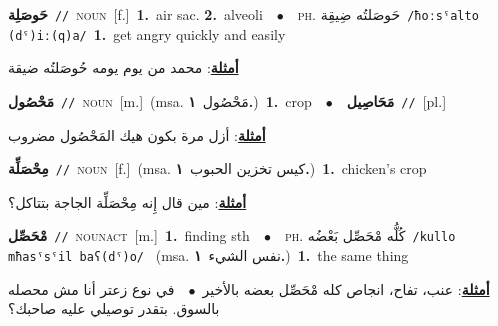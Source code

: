 \documentclass[10pt,a4paper,twoside]{article} %
\begin{document}
\begin{multicols}{2}
{\setlength\topsep{0pt}\textbf{\foreignlanguage{arabic}{حَوصَلِة}}\ {\color{gray}\texttt{//}\color{black}}\ \textsc{noun}\ [f.]\ \textbf{1.}~air sac.  \textbf{2.}~alveoli\ \ $\bullet$\ \ \textsc{ph.} \color{gray} \foreignlanguage{arabic}{حَوصَلتُه ضِيقِة}\color{black}\ {\color{gray}\texttt{/{\sffamily ħoːsˤalto (dˤ)iː(q)a}/}\color{black}}\ \textbf{1.}~get angry quickly and easily\  \begin{flushright}\color{gray}\foreignlanguage{arabic}{\textbf{\underline{\foreignlanguage{arabic}{أمثلة}}}: محمد من يوم يومه حُوصَلتُه ضيقة}\end{flushright}\color{black}} \vspace{2mm}

{\setlength\topsep{0pt}\textbf{\foreignlanguage{arabic}{مَحْصُول}}\ {\color{gray}\texttt{//}\color{black}}\ \textsc{noun}\ [m.]\ \color{gray}(msa. \foreignlanguage{arabic}{مَحْصُول}~\foreignlanguage{arabic}{\textbf{١.}})\color{black}\ \textbf{1.}~crop\ \ $\bullet$\ \ \setlength\topsep{0pt}\textbf{\foreignlanguage{arabic}{مَحَاصِيل}}\ {\color{gray}\texttt{//}\color{black}}\ [pl.]\  \begin{flushright}\color{gray}\foreignlanguage{arabic}{\textbf{\underline{\foreignlanguage{arabic}{أمثلة}}}: أزل مرة بكون هيك المَحْصُول مضروب}\end{flushright}\color{black}} \vspace{2mm}

{\setlength\topsep{0pt}\textbf{\foreignlanguage{arabic}{مِحْصَلِّة}}\ {\color{gray}\texttt{//}\color{black}}\ \textsc{noun}\ [f.]\ \color{gray}(msa. \foreignlanguage{arabic}{كيس تخزين الحبوب}~\foreignlanguage{arabic}{\textbf{١.}})\color{black}\ \textbf{1.}~chicken's crop\  \begin{flushright}\color{gray}\foreignlanguage{arabic}{\textbf{\underline{\foreignlanguage{arabic}{أمثلة}}}: مين قال إِنه مِحْصَلِّة الجاجة بتتاكل؟}\end{flushright}\color{black}} \vspace{2mm}

{\setlength\topsep{0pt}\textbf{\foreignlanguage{arabic}{مْحَصِّل}}\ {\color{gray}\texttt{//}\color{black}}\ \textsc{noun\textunderscore act}\ [m.]\ \textbf{1.}~finding sth\ \ $\bullet$\ \ \textsc{ph.} \color{gray} \foreignlanguage{arabic}{كُلُّه مْحَصِّل بَعْضُه}\color{black}\ {\color{gray}\texttt{/{\sffamily kullo mħasˤsˤil baʕ(dˤ)o}/}\color{black}}\ \color{gray} (msa. \foreignlanguage{arabic}{نفس الشيء}~\foreignlanguage{arabic}{\textbf{١.}})\color{black}\ \textbf{1.}~the same thing\  \begin{flushright}\color{gray}\foreignlanguage{arabic}{\textbf{\underline{\foreignlanguage{arabic}{أمثلة}}}: عنب، تفاح، انجاص كله مْحَصِّل بعضه بالأخير\ $\bullet$\ \  في نوع زعتر أنا مش محصله بالسوق. بتقدر توصيلي عليه صاحبك؟}\end{flushright}\color{black}} \vspace{2mm}


\end{multicols}
\end{document}
